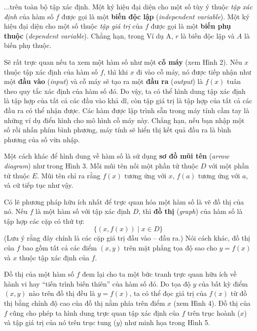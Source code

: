 \documentclass[10pt,letterpaper]{article}
\begin{document}
\begin{minipage}[t]{0.71\textwidth}
    ...trên toàn bộ tập xác định. Một ký hiệu đại diện cho một số tùy ý thuộc \textit{tập xác định} của hàm số $f$ được gọi là một \textbf{biến độc lập} (\textit{independent variable}). Một ký hiệu đại diện cho một số thuộc \textit{tập giá trị} của $f$ được gọi là một \textbf{biến phụ thuộc} (\textit{dependent variable}). Chẳng hạn, trong Ví dụ A, $r$ là biến độc lập và $A$ là biến phụ thuộc.

    Sẽ rất trực quan nếu ta xem một hàm số như một \textbf{cỗ máy} (xem Hình 2). Nếu $x$ thuộc tập xác định của hàm số $f$, thì khi $x$ đi vào cỗ máy, nó được tiếp nhận như một \textbf{đầu vào} (\textit{input}) và cỗ máy sẽ tạo ra một \textbf{đầu ra} (\textit{output}) là $f(x)$ tuân theo quy tắc xác định của hàm số đó. Do vậy, ta có thể hình dung tập xác định là tập hợp của tất cả các đầu vào khả dĩ, còn tập giá trị là tập hợp của tất cả các đầu ra có thể nhận được. Các hàm được lập trình sẵn trong máy tính cầm tay là những ví dụ điển hình cho mô hình cỗ máy này. Chẳng hạn, nếu bạn nhập một số rồi nhấn phím bình phương, máy tính sẽ hiển thị kết quả đầu ra là bình phương của số vừa nhập.

    Một cách khác để hình dung về hàm số là sử dụng \textbf{sơ đồ mũi tên} (\textit{arrow diagram}) như trong Hình 3. Mỗi mũi tên nối một phần tử thuộc $D$ với một phần tử thuộc $E$. Mũi tên chỉ ra rằng $f(x)$ tương ứng với $x$, $f(a)$ tương ứng với $a$, và cứ tiếp tục như vậy.

    Có lẽ phương pháp hữu ích nhất để trực quan hóa một hàm số là vẽ đồ thị của nó. Nếu $f$ là một hàm số với tập xác định $D$, thì \textbf{đồ thị} (\textit{graph}) của hàm số là tập hợp các cặp có thứ tự:
    \[
    \{ (x, f(x)) \mid x \in D \}
    \]
    (Lưu ý rằng đây chính là các cặp giá trị đầu vào -- đầu ra.) Nói cách khác, đồ thị của $f$ bao gồm tất cả các điểm $(x, y)$ trên mặt phẳng tọa độ sao cho $y = f(x)$ và $x$ thuộc tập xác định của $f$.

    Đồ thị của một hàm số $f$ đem lại cho ta một bức tranh trực quan hữu ích về hành vi hay ``tiến trình biến thiên'' của hàm số đó. Do tọa độ $y$ của bất kỳ điểm $(x, y)$ nào trên đồ thị đều là $y = f(x)$, ta có thể đọc giá trị của $f(x)$ từ đồ thị bằng chính độ cao của đồ thị nằm phía trên điểm $x$ (xem Hình 4). Đồ thị của $f$ cũng cho phép ta hình dung trực quan tập xác định của $f$ trên trục hoành ($x$) và tập giá trị của nó trên trục tung ($y$) như minh họa trong Hình 5.


\end{minipage}
\end{document}
